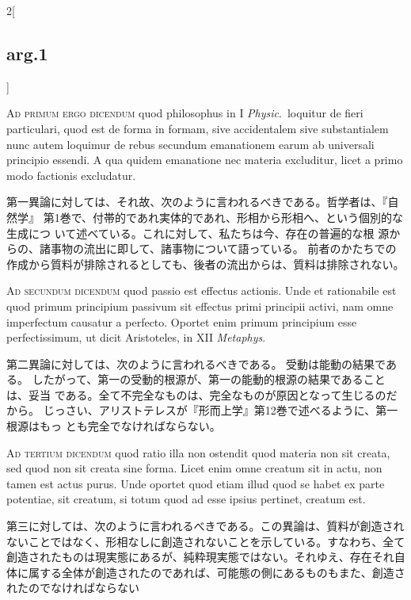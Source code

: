 \documentclass[paper=a4paper,fontsize=10pt,jafontsize=9pt,titlepage]{jlreq}
\begin{document}
\begin{paracol}{2}[\subsection{arg.1}]
\switchcolumn*[\subsection{ad.1}]

{\scshape Ad primum ergo dicendum} quod philosophus in I {\itshape Physic}.~loquitur de fieri
particulari, quod est de forma in formam, sive accidentalem sive
substantialem nunc autem loquimur de rebus secundum emanationem earum ab
universali principio essendi. A qua quidem emanatione nec materia
excluditur, licet a primo modo factionis excludatur.

\switchcolumn

第一異論に対しては、それ故、次のように言われるべきである。哲学者は、『自然学』
第1巻で、付帯的であれ実体的であれ、形相から形相へ、という個別的な生成につ
いて述べている。これに対して、私たちは今、存在の普遍的な根
源からの、諸事物の流出に即して、諸事物について語っている。
前者のかたちでの作成から質料が排除されるとしても、後者の流出からは、質料は排除されない。

\switchcolumn*[\subsection{ad.2}]

{\scshape Ad secundum dicendum} quod passio est effectus actionis. Unde
 et rationabile est quod primum principium passivum sit effectus primi
 principii activi, nam omne imperfectum causatur a perfecto. Oportet
 enim primum principium esse perfectissimum, ut dicit Aristoteles, in
 XII {\itshape Metaphys}.

\switchcolumn

第二異論に対しては、次のように言われるべきである。
受動は能動の結果である。
したがって、第一の受動的根源が、第一の能動的根源の結果であることは、妥当
 である。全て不完全なものは、完全なものが原因となって生じるのだから。
じっさい、アリストテレスが『形而上学』第12巻で述べるように、第一根源はもっ
 とも完全でなければならない。

\switchcolumn*[\subsection{ad.3}]

{\scshape Ad tertium dicendum} quod ratio illa non ostendit quod materia
 non sit creata, sed quod non sit creata sine forma. Licet enim omne
 creatum sit in actu, non tamen est actus purus. Unde oportet quod etiam
 illud quod se habet ex parte potentiae, sit creatum, si totum quod ad
 esse ipsius pertinet, creatum est.

\switchcolumn

第三に対しては、次のように言われるべきである。この異論は、質料が創造され
ないことではなく、形相なしに創造されないことを示している。すなわち、全て
創造されたものは現実態にあるが、純粋現実態ではない。それゆえ、存在それ自
体に属する全体が創造されたのであれば、可能態の側にあるものもまた、創造さ
れたのでなければならない

\end{paracol}
\newpage
{}
{}
\setcounter{section}{3}
\setcounter{subsection}{0}
\end{document}
